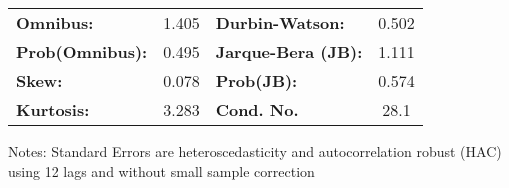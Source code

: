 \begin{center}
\begin{tabular}{lcccccc}
\bottomrule
\end{tabular}
\begin{tabular}{lclc}
\textbf{Omnibus:}       &  1.405 & \textbf{  Durbin-Watson:     } &    0.502  \\
\textbf{Prob(Omnibus):} &  0.495 & \textbf{  Jarque-Bera (JB):  } &    1.111  \\
\textbf{Skew:}          &  0.078 & \textbf{  Prob(JB):          } &    0.574  \\
\textbf{Kurtosis:}      &  3.283 & \textbf{  Cond. No.          } &     28.1  \\
\bottomrule
\end{tabular}
\end{center}

Notes: \newline
 [1] Standard Errors are heteroscedasticity and autocorrelation robust (HAC) using 12 lags and without small sample correction
